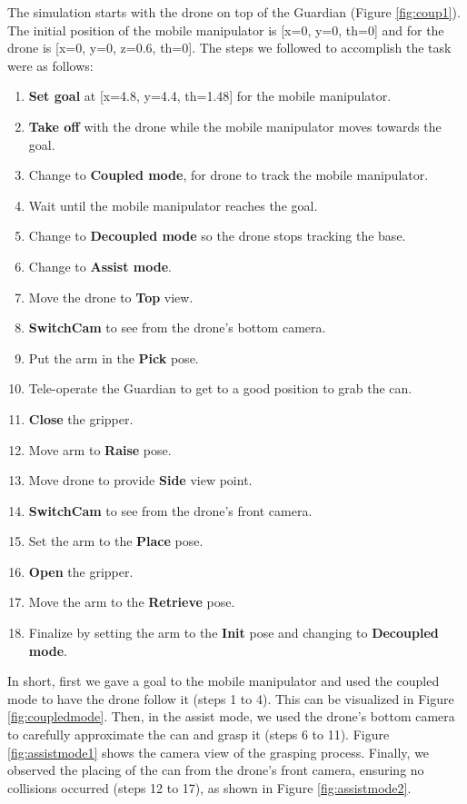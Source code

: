 \documentclass[11pt,a4paper]{article}
\begin{document}
The simulation starts with the drone on top of the Guardian (Figure \ref{fig:coup1}). The initial position of the mobile manipulator is [x=0, y=0, th=0] and for the drone is [x=0, y=0, z=0.6, th=0]. The steps we followed to accomplish the task were as follows:
\begin{enumerate}

	\item \textbf{Set goal} at [x=4.8, y=4.4, th=1.48] for the mobile manipulator.
	\item \textbf{Take off} with the drone while the mobile manipulator moves towards the goal.
	\item Change to \textbf{Coupled mode}, for drone to track the mobile manipulator.
	\item Wait until the mobile manipulator reaches the goal.
	\item Change to \textbf{Decoupled mode} so the drone stops tracking the base.
	\item Change to \textbf{Assist mode}.
	\item Move the drone to \textbf{Top} view.
	\item \textbf{SwitchCam} to see from the drone's bottom camera.
	\item Put the arm in the \textbf{Pick} pose.
	\item Tele-operate the Guardian to get to a good position to grab the can.
	\item \textbf{Close} the gripper.
	\item Move arm to \textbf{Raise} pose.
	\item Move drone to provide \textbf{Side} view point.
	\item \textbf{SwitchCam} to see from the drone's front camera.
	\item Set the arm to the \textbf{Place} pose.
	\item \textbf{Open} the gripper.
	\item Move the arm to the \textbf{Retrieve} pose.
	\item Finalize by setting the arm to the \textbf{Init} pose and changing to \textbf{Decoupled mode}.
	
\end{enumerate}


In short, first we gave a goal to the mobile manipulator and used the coupled mode to have the drone follow it (steps 1 to 4). This can be visualized in Figure \ref{fig:coupledmode}. Then, in the assist mode, we used the drone's bottom camera to carefully approximate the can and grasp it (steps 6 to 11). Figure \ref{fig:assistmode1} shows the camera view of the grasping process. Finally, we observed the placing of the can from the drone's front camera, ensuring no collisions occurred (steps 12 to 17), as shown in Figure \ref{fig:assistmode2}.  
\end{document}
